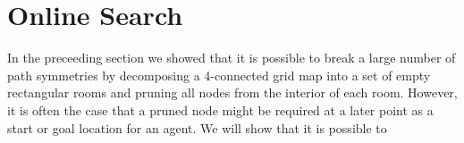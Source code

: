 \section{Online Search}
In the preceeding section we showed that it is possible to break a large 
number of path symmetries by decomposing a 4-connected grid map into 
a set of empty rectangular rooms and pruning all nodes from the interior of
each room.
However, it is often the case that a pruned node might be required at a later
point as a start or goal location for an agent.
We will show that it is possible to 



